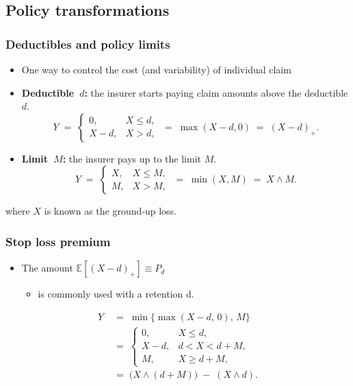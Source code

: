 \documentclass{article}
\begin{document}
\subsection{Policy transformations}

\subsubsection{Deductibles and policy limits}
\begin{itemize}
    \item One way to control the cost (and variability) of individual claim 

  \item \textbf{Deductible~$d$:} the insurer starts paying claim amounts above the deductible $d$.  
    \[
      Y \;=\;
      \begin{cases}
        0,       & X \le d,\\
        X - d,   & X > d,
      \end{cases}
      \;=\;\max(X-d,0)\;=\;(X-d)_{+}.
    \]
  \item \textbf{Limit~$M$:} the insurer pays up to the limit $M$.  
    \[
      Y \;=\;
      \begin{cases}
        X, & X \le M,\\
        M, & X > M,
      \end{cases}
      \;=\;\min(X,M)\;=\;X\wedge M.
    \]
\end{itemize}

where $X$ is known as the ground‑up loss.


\subsubsection{Stop loss premium}

\begin{itemize}
    \item The amount $\mathbb{E}[(X - d)_+] \equiv P_d$
    \begin{itemize}
        \item is commonly used with a retention d.
    \end{itemize}
\end{itemize}



\begin{align*}
    Y &\;=\;\min\bigl\{\max(X - d,\,0),\,M\bigr\}\\
&\;=\;
\begin{cases}
0,       & X \le d,\\
X - d,   & d < X < d + M,\\
M,       & X \ge d + M,
\end{cases}\\
&\;=\;
\bigl(X\wedge (d+M)\bigr)\;-\;(X\wedge d).
\end{align*}
\end{document}
